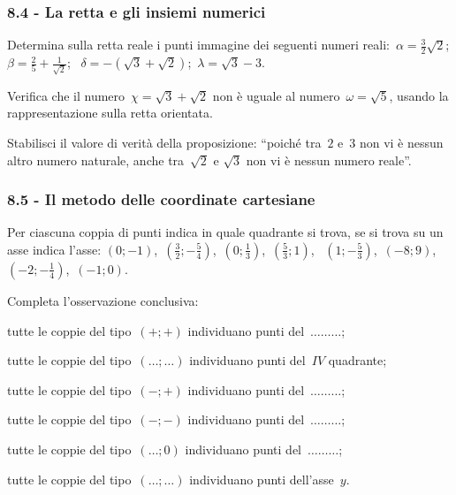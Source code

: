 \subsubsection*{8.4 - La retta e gli insiemi numerici}

\begin{esercizio}
\label{ese:8.17}
Determina sulla retta reale i punti immagine dei seguenti numeri reali:~$\alpha =\frac{3}{2}\sqrt{2}$;\, $\beta =\frac{2}{5}+\frac{1}{\sqrt{2}}$;
\, $\delta =-\left(\sqrt{3}+\sqrt{2}\right)$;\, $\lambda =\sqrt{3}-3$.
\end{esercizio}

\begin{esercizio}
\label{ese:8.18}
Verifica che il numero~$\chi =\sqrt{3}+\sqrt{2}$ non è uguale al numero~$\omega =\sqrt{5}$, usando la rappresentazione sulla retta orientata.
\end{esercizio}

\begin{esercizio}
\label{ese:8.19}
Stabilisci il valore di verità della proposizione: ``poiché tra~$2$ e~$3$ non vi è nessun altro numero naturale, anche tra~$\sqrt{2}$ e
$\sqrt{3}$ non vi è nessun numero reale''.
\end{esercizio}

\subsubsection*{8.5 - Il metodo delle coordinate cartesiane}
\begin{esercizio}
\label{ese:8.20}
Per ciascuna coppia di punti indica in quale quadrante si trova, se si trova su un asse indica l'asse:
$(0;-1)$, \,$\left(\frac{3}{2};-\frac{5}{4}\right)$, \,$\left(0;\frac{1}{3}\right)$, \,$\left(\frac{5}{3};1\right)$, \,
$\left(1;-\frac{5}{3}\right)$, \,$(-8;9)$, \,$\left(-2;-\frac{1}{4}\right)$, \,$(-1;0)$.

Completa l'osservazione conclusiva:
\begin{itemize*}
\item tutte le coppie del tipo~$(+;+)$ individuano punti del~$\ldots \ldots \ldots$;
\item tutte le coppie del tipo~$(\ldots;\ldots)$ individuano punti del~$IV$ quadrante;
\item tutte le coppie del tipo~$(-;+)$ individuano punti del~$\ldots \ldots \ldots$;
\item tutte le coppie del tipo~$(-;-)$ individuano punti del~$\ldots \ldots \ldots$;
\item tutte le coppie del tipo~$(\ldots;0)$ individuano punti del~$\ldots \ldots \ldots$;
\item tutte le coppie del tipo~$(\ldots;\ldots)$ individuano punti dell'asse~$y$.
\end{itemize*}
\end{esercizio}

